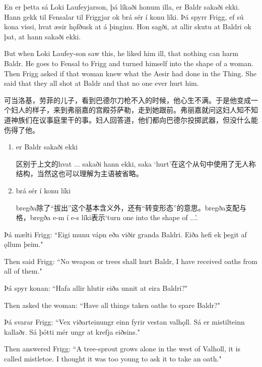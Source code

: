 \begin{paracol}{2}
    En er þetta sá Loki Laufeyjarson, þá líkaði honum illa, er Baldr sakaði ekki. Hann gekk til Fensalar til Friggjar ok brá sér í konu líki. Þá spyrr Frigg, ef sú kona vissi, hvat æsir hǫfðusk at á þinginu. Hon sagði, at allir skutu at Baldri ok þat, at hann sakaði ekki.

    \switchcolumn

    But when Loki Laufey-son saw this, he liked him ill, that nothing can harm Baldr. He goes to Fensal to Frigg and turned himself into the shape of a woman. Then Frigg asked if that woman knew what the Aesir had done in the Thing. She said that they all shot at Baldr and that no one ever hurt him.
\end{paracol}
\begin{translation*}{}
    可当洛基，劳菲的儿子，看到巴德尔刀枪不入的时候，他心生不满。于是他变成一个妇人的样子，来到弗丽嘉的宫殿芬萨勒，走到她跟前。弗丽嘉就问这妇人知不知道神族们在议事庭里干的事。妇人回答道，他们都向巴德尔投掷武器，但没什么能伤得了他。
\end{translation*}
\begin{grammar*}{}
    \begin{enumerate}[leftmargin=*]
        \item er Baldr sakaði ekki

              区别于上文的hvat ... sakaði hann ekki, saka `hurt'在这个从句中使用了无人称结构，当然这也可以理解为主语被省略。

        \item brá sér í konu líki

              bregða除了“拔出”这个基本含义外，还有“转变形态”的意思。bregða支配与格，bregða e-m í e-s líki表示`turn one into the shape of ...'.
    \end{enumerate}
\end{grammar*}
\begin{paracol}{2}
    Þá mælti Frigg: ``Eigi munu vápn eða viðir granda Baldri. Eiða hefi ek þegit af ǫllum þeim."

    \switchcolumn

    Then said Frigg: ``No weapon or trees shall hurt Baldr, I have received oaths from all of them."

    \switchcolumn*

    Þá spyr konan: ``Hafa allir hlutir eiða unnit at eira Baldri?"

    \switchcolumn
    Then asked the woman: ``Have all things taken oaths to spare Baldr?"

    \switchcolumn*
    Þá svarar Frigg: ``Vex viðarteinungr einn fyrir vestan valhǫll. Sá er mistilteinn kallaðr. Sá þótti mér ungr at krefja eiðsins."

    \switchcolumn

    Then answered Frigg: ``A tree-sprout grows alone in the west of Valholl, it is called mistletoe. I thought it was too young to ask it to take an oath."
\end{paracol}
